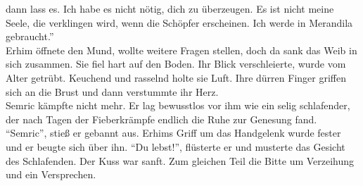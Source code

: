 dann lass es. Ich habe es nicht nötig, dich zu überzeugen. Es ist nicht meine Seele, die 
verklingen wird, wenn die Schöpfer erscheinen. Ich werde in Merandila gebraucht.''\\
Erhim öffnete den Mund, wollte weitere Fragen stellen, doch da sank das Weib in sich zusammen. Sie 
fiel hart auf den Boden. Ihr Blick verschleierte, wurde vom Alter getrübt. Keuchend und rasselnd 
holte sie Luft. Ihre dürren Finger griffen sich an die Brust und dann verstummte ihr Herz.\\
Semric kämpfte nicht mehr. Er lag bewusstlos vor ihm wie ein selig schlafender, der nach Tagen der 
Fieberkrämpfe endlich die Ruhe zur Genesung fand. ``Semric'', stieß er gebannt aus. Erhims Griff um 
das Handgelenk wurde fester und er beugte sich über ihn. ``Du lebst!'', flüsterte er und musterte 
das Gesicht des Schlafenden. Der Kuss war sanft. Zum gleichen Teil die Bitte um Verzeihung und ein 
Versprechen.\\






